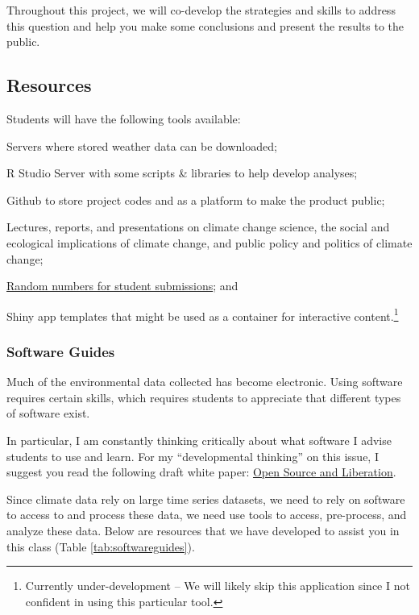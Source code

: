 \documentclass{article}\usepackage[]{graphicx}\usepackage[]{color}
\newenvironment{itemize*}%
  {\begin{itemize}%
    \setlength{\itemsep}{0pt}%
    \setlength{\parskip}{0pt}}%
  {\end{itemize}}
\begin{document}
Throughout this project, we will co-develop the strategies and skills to address this question and help you make some conclusions and present the results to the public.

\subsection{Resources}

Students will have the following tools available:

\begin{itemize*}
  \item Servers where stored weather data can be downloaded;
  \item R Studio Server with some scripts \& libraries to help develop analyses;
  \item Github to store project codes and as a platform to make the product public;
  \item Lectures, reports, and presentations on climate change science, the social and ecological implications of climate change, and public policy and politics of climate change;
  \item \href{https://github.com/marclos/Climate_Change_Narratives/raw/master/Admin/RandomNumbers.pdf}{Random numbers for student submissions}; and
  \item Shiny app templates that might be used as a container for interactive content.\footnote{Currently under-development -- We will likely skip this application since I not confident in using this particular tool.}
\end{itemize*}

\subsubsection{Software Guides}

Much of the environmental data collected has become electronic. Using software requires certain skills, which requires students to appreciate that different types of software exist. 

In particular, I am constantly thinking critically about what software I advise students to use and learn. For my ``developmental thinking'' on this issue, I suggest you read the following draft white paper: \href{https://github.com/marclos/Climate_Change_Narratives/raw/master/Admin/Liberation_via_Open_Source_Software.pdf}{Open Source and Liberation}. 

Since climate data rely on large time series datasets, we need to rely on software to access to and process these data, we need use tools to access, pre-process, and analyze these data. Below are resources that we have developed to assist you in this class (Table \ref{tab:softwareguides}).
\end{document}
